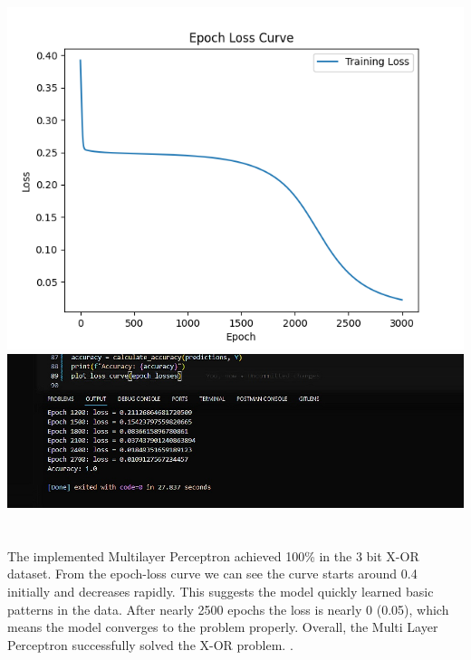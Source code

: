 \documentclass{article}
\begin{document}
    \vspace{1cm}
    \section{}
    \vspace{0.5cm}
    \includegraphics[width=15cm, height=10cm]{Figure_1.png}\\
    \includegraphics[width=15cm]{publication_ready_SS(142)_1.jpg}

    \section{}

    \noindent The implemented Multilayer Perceptron achieved 100\% in the 3 bit X-OR dataset. From the epoch-loss curve we can see the curve starts around 0.4 initially and decreases rapidly. This suggests the model quickly learned basic patterns in the data. After nearly 2500 epochs the loss is nearly 0 (0.05), which means the model converges to the problem properly. Overall, the Multi Layer Perceptron successfully solved the X-OR problem. . 
\end{document}
